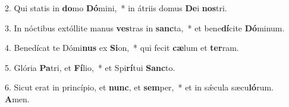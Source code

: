 2. Qui statis in \textbf{do}mo \textbf{Dó}mini,~*  in átriis domus \textbf{De}i \textbf{nos}tri.\

3. In nóctibus extóllite manus \textbf{ves}tras in \textbf{sanc}ta,~*  et bene\textbf{dí}cite \textbf{Dó}minum.\

4. Benedícat te Dómi\textbf{nus} ex \textbf{Si}on,~*  qui fecit \textbf{cæ}lum et \textbf{ter}ram.\

5. Glória \textbf{Pa}tri, et \textbf{Fí}lio,~*  et Spi\textbf{rí}tui \textbf{Sanc}to.\

6. Sicut erat in princípio, et \textbf{nunc}, et \textbf{sem}per,~*  et in sǽcula sæcu\textbf{ló}rum. \textbf{A}men.\

